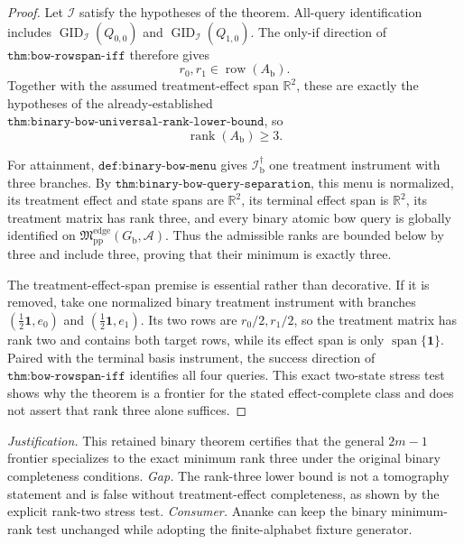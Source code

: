 \documentclass{article}
\begin{document}
\begin{proof}
Let \(\mathcal I\) satisfy the hypotheses of the theorem.  All-query identification includes \(\operatorname{GID}_{\mathcal I}(Q_{0,0})\) and \(\operatorname{GID}_{\mathcal I}(Q_{1,0})\).  The only-if direction of \(\texttt{thm:bow-rowspan-iff}\) therefore gives
\[
r_0,r_1\in\operatorname{row}(A_{\mathrm b}).
\]
Together with the assumed treatment-effect span \(\mathbb R^2\), these are exactly the hypotheses of the already-established \(\texttt{thm:binary-bow-universal-rank-lower-bound}\), so
\[
\operatorname{rank}(A_{\mathrm b})\ge3.
\]

For attainment, \(\texttt{def:binary-bow-menu}\) gives \(\mathcal I_{\mathrm b}^{\dagger}\) one treatment instrument with three branches.  By \(\texttt{thm:binary-bow-query-separation}\), this menu is normalized, its treatment effect and state spans are \(\mathbb R^2\), its terminal effect span is \(\mathbb R^2\), its treatment matrix has rank three, and every binary atomic bow query is globally identified on \(\mathfrak M_{\mathrm{pp}}^{\mathrm{edge}}(G_{\mathrm b},\mathcal A)\).  Thus the admissible ranks are bounded below by three and include three, proving that their minimum is exactly three.

The treatment-effect-span premise is essential rather than decorative.  If it is removed, take one normalized binary treatment instrument with branches \((\tfrac12\mathbf 1,e_0)\) and \((\tfrac12\mathbf 1,e_1)\).  Its two rows are \(r_0/2,r_1/2\), so the treatment matrix has rank two and contains both target rows, while its effect span is only \(\operatorname{span}\{\mathbf 1\}\).  Paired with the terminal basis instrument, the success direction of \(\texttt{thm:bow-rowspan-iff}\) identifies all four queries.  This exact two-state stress test shows why the theorem is a frontier for the stated effect-complete class and does not assert that rank three alone suffices.
\end{proof}
\par\smallskip\noindent \textit{Justification.} This retained binary theorem certifies that the general \(2m-1\) frontier specializes to the exact minimum rank three under the original binary completeness conditions. \textit{Gap.} The rank-three lower bound is not a tomography statement and is false without treatment-effect completeness, as shown by the explicit rank-two stress test. \textit{Consumer.} Ananke can keep the binary minimum-rank test unchanged while adopting the finite-alphabet fixture generator.
\end{document}
